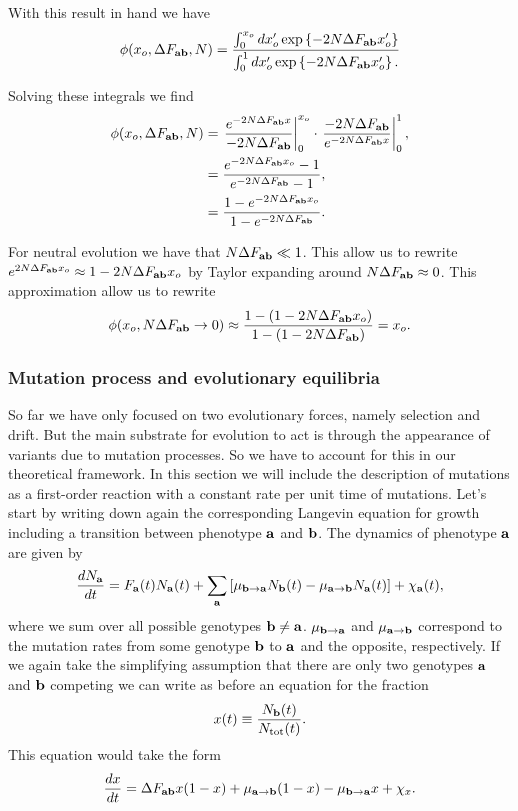 With this result in hand we have
\begin{equation}
  \phi(x_o, \Delta F_{\mathbf{ab}}, N) = { \int_0^{x_o} dx_o' \exp \left\{ -2 N \Delta F_{\mathbf{ab}} x_o'  \right\}
  \over
  \int_0^1 dx_o' \exp \left\{ -2 N \Delta F_{\mathbf{ab}} x_o'  \right\}.}
\end{equation}

Solving these integrals we find
\begin{align}
\phi(x_o, \Delta F_{\mathbf{ab}}, N) &= \left. {e^{-2 N \Delta F_{\mathbf{ab}} x} \over -2 N \Delta F_{\mathbf{ab}}}\right\rvert_0^{x_o}
\cdot \left.{-2 N \Delta F_{\mathbf{ab}} \over e^{-2N \Delta F_{\mathbf{ab}} x}}\right\rvert_0^1,\\
&= {e^{-2 N \Delta F_{\mathbf{ab}} x_o} - 1 \over e^{-2 N \Delta F_{\mathbf{ab}}} - 1},\\
&= {1 - e^{-2 N \Delta F_{\mathbf{ab}} x_o} \over 1 - e^{-2 N \Delta F_{\mathbf{ab}}}}.\\
\end{align}

For neutral evolution we have that $N\Delta F_{\mathbf{ab}} \ll 1$. This allow us to rewrite
$e^{2 N \Delta F_{\mathbf{ab}} x_o} \approx 1 - 2 N \Delta F_{\mathbf{ab}} x_o$ by Taylor expanding around
$N \Delta F_{\mathbf{ab}} \approx 0$.
This approximation allow us to rewrite
\begin{equation}
  \phi(x_o, N\Delta F_{\mathbf{ab}} \rightarrow 0) \approx
  {1 - (1 - 2 N \Delta F_{\mathbf{ab}}x_o) \over 1 - (1 - 2 N \Delta F_{\mathbf{ab}})} = x_o.
\end{equation}

\subsubsection{Mutation process and evolutionary equilibria}

So far we have only focused on two evolutionary forces, namely selection and
drift. But the main substrate for evolution to act is through the appearance of
variants due to mutation processes. So we have to account for this in our
theoretical framework. In this section we will include the description of
mutations as a first-order reaction with a constant rate per unit time of
mutations. Let's start by writing down again the corresponding Langevin equation
for growth including a transition between phenotype $\mathbf{a}$ and $\mathbf{b}$. The
dynamics of phenotype $\mathbf{a}$ are given by
\begin{equation}
  {d{N_{\mathbf{a}}} \over dt} = F_{\mathbf{a}}(t) N_{\mathbf{a}}(t) +
  \sum_{\mathbf{a}} \left[ \mu_{\mathbf{b} \rightarrow \mathbf{a}} N_{\mathbf{b}}(t) -
  \mu_{\mathbf{a} \rightarrow \mathbf{b}} N_{\mathbf{a}}(t) \right] + \chi_{\mathbf{a}}(t),
\end{equation}
where we sum over all possible genotypes $\mathbf{b} \neq \mathbf{a}$. $\mu_{\mathbf{b} \rightarrow \mathbf{a}}$ and
$\mu_{\mathbf{a} \rightarrow \mathbf{b}}$ correspond to the mutation rates from some genotype $\mathbf{b}$ to
$\mathbf{a}$ and the opposite, respectively. If we again take the simplifying
assumption that there are only two genotypes $\mathbf{a}$ and $\mathbf{b}$ competing we
can write as before an equation for the fraction
\begin{equation}
  x(t) \equiv {N_{\mathbf{b}}(t) \over N_{\text{tot}}(t)}.
\end{equation}
This equation would take the form
\begin{equation}
  {d{x} \over dt} = \Delta F_{\mathbf{ab}} x (1 - x) + \mu_{\mathbf{a} \rightarrow \mathbf{b}} (1 - x) - \mu_{\mathbf{b} \rightarrow \mathbf{a}} x + \chi_x.
\end{equation}

